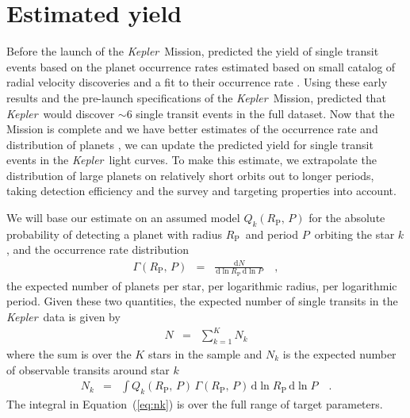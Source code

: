\documentclass[12pt,preprint]{aastex}
\newcommand{\project}[1]{\textsl{#1}}
\newcommand{\kepler}{\project{Kepler}}
\renewcommand{\eqref}[1]{\ref{eq:#1}}
\newcommand{\Eq}[1]{Equation~(\eqref{#1})}
\newcommand{\eq}[1]{\Eq{#1}}
\newcommand{\eqlabel}[1]{\label{eq:#1}}
\newcommand{\sectlabel}[1]{\label{sect:#1}}
\newcommand{\dd}{\ensuremath{\,\mathrm{d}}}
\newcommand{\period}{{\ensuremath{P}}}
\newcommand{\rp}{{\ensuremath{R_\mathrm{P}}}}
\newcommand{\rate}{{\ensuremath{\Gamma}}}
\begin{document}
\section{Estimated yield}\sectlabel{est}

Before the launch of the \kepler\ Mission, \citet{Yee:2008} predicted the
yield of single transit events based on the planet occurrence rates estimated
based on small catalog of radial velocity discoveries \citep{Butler:2006} and
a fit to their occurrence rate \citep{Cumming:2008}.
Using these early results and the pre-launch specifications of the \kepler\
Mission, \citet{Yee:2008} predicted that \kepler\ would discover $\sim 6$
single transit events in the full dataset.
Now that the Mission is complete and we have better estimates of the
occurrence rate and distribution of planets \citep[for example][]{Dong:2013,
Petigura:2013, Foreman-Mackey:2014, Dressing:2015}, we can update the
predicted yield for single transit events in the \kepler\ light curves.
To make this estimate, we extrapolate the distribution of large planets on
relatively short orbits out to longer periods, taking detection efficiency
and the survey and targeting properties into account.

We will base our estimate on an assumed model $Q_k(\rp,\,\period)$ for the
absolute probability of detecting a planet with radius \rp\ and period
\period\ orbiting the star $k$, and the occurrence rate distribution
\begin{eqnarray}
\rate (\rp,\,\period) &=& \frac{\dd N}{\dd\ln\rp\dd\ln\period} \quad,
\end{eqnarray}
the expected number of planets per star, per logarithmic radius, per
logarithmic period.
Given these two quantities, the expected number of single transits in the
\kepler\ data is given by
\begin{eqnarray}
N &=& \sum_{k=1}^K N_k
\end{eqnarray}
where the sum is over the $K$ stars in the sample and $N_k$ is the expected
number of observable transits around star $k$
\begin{eqnarray}\eqlabel{nk}
N_k &=& \int Q_k(\rp,\,\period) \, \rate (\rp,\,\period)
    \dd\ln\rp \dd\ln\period \quad.
\end{eqnarray}
The integral in \eq{nk} is over the full range of target parameters.
\end{document}
